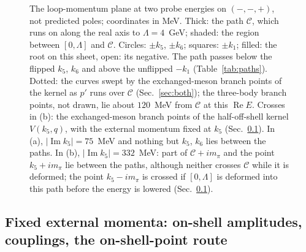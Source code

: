 \documentclass[11pt]{article}
\begin{document}
\begin{figure}[p]
\caption{The loop-momentum plane at two probe energies on $(-,-,+)$, not predicted poles; coordinates in MeV. Thick: the path $\mathcal C$, which runs on along the real axis to $\Lambda=4$~GeV; shaded: the region between $[0,\Lambda]$ and $\mathcal C$. Circles: $\pm k_5$, $\pm k_6$; squares: $\pm k_1$; filled: the root on this sheet, open: its negative. The path passes below the flipped $k_5$, $k_6$ and above the unflipped $-k_1$ (Table~\ref{tab:paths}). Dotted: the curves swept by the exchanged-meson branch points of the kernel as $p'$ runs over $\mathcal C$ (Sec.~\ref{sec:both}); the three-body branch points, not drawn, lie about $120$~MeV from $\mathcal C$ at this $\operatorname{Re}E$. Crosses in (b): the exchanged-meson branch points of the half-off-shell kernel $V(k_5,q)$, with the external momentum fixed at $k_5$ (Sec.~\ref{sec:external}). In (a), $|\operatorname{Im}k_5|=75$~MeV and nothing but $k_5$, $k_6$ lies between the paths. In (b), $|\operatorname{Im}k_5|=332$~MeV: part of $\mathcal C+im_\pi$ and the point $k_5+im_\pi$ lie between the paths, although neither crosses $\mathcal C$ while it is deformed; the point $k_5-im_\pi$ is crossed if $[0,\Lambda]$ is deformed into this path before the energy is lowered (Sec.~\ref{sec:external}).}
\label{fig:qplane}
\end{figure}

\subsection{Fixed external momenta: on-shell amplitudes, couplings, the on-shell-point route}\label{sec:external}
\end{document}
